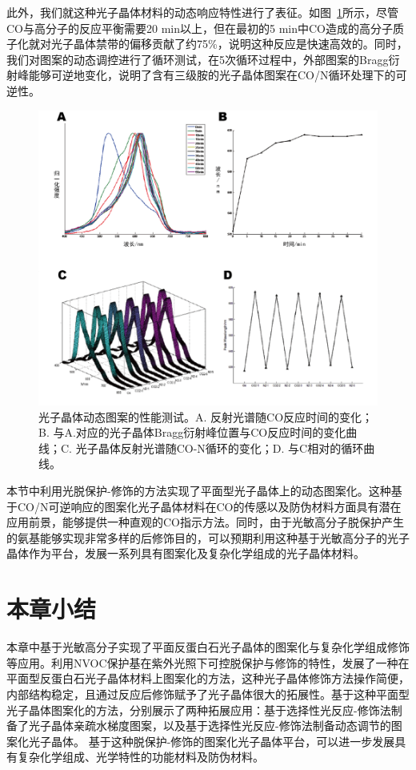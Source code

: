 此外，我们就这种光子晶体材料的动态响应特性进行了表征。如图~\ref{fig:CO2-saturation}所示，尽管CO与高分子的反应平衡需要20 min以上，但在最初的5 min中CO造成的高分子质子化就对光子晶体禁带的偏移贡献了约75\%，说明这种反应是快速高效的。同时，我们对图案的动态调控进行了循环测试，在5次循环过程中，外部图案的Bragg衍射峰能够可逆地变化，说明了含有三级胺的光子晶体图案在CO/N循环处理下的可逆性。
\begin{figure}[htbp]
  \centering
  \includegraphics[width=0.85\linewidth]{figures/ch4/CO2-saturation.png}
  \caption{光子晶体动态图案的性能测试。A. 反射光谱随CO反应时间的变化；B. 与A.对应的光子晶体Bragg衍射峰位置与CO反应时间的变化曲线；C. 光子晶体反射光谱随CO-N循环的变化；D. 与C相对的循环曲线。}
  \label{fig:CO2-saturation}
\end{figure}

本节中利用光脱保护-修饰的方法实现了平面型光子晶体上的动态图案化。这种基于CO/N可逆响应的图案化光子晶体材料在CO的传感以及防伪材料方面具有潜在应用前景，能够提供一种直观的CO指示方法。同时，由于光敏高分子脱保护产生的氨基能够实现非常多样的后修饰目的，可以预期利用这种基于光敏高分子的光子晶体作为平台，发展一系列具有图案化及复杂化学组成的光子晶体材料。


\section{本章小结}

本章中基于光敏高分子实现了平面反蛋白石光子晶体的图案化与复杂化学组成修饰等应用。利用NVOC保护基在紫外光照下可控脱保护与修饰的特性，发展了一种在平面型反蛋白石光子晶体材料上图案化的方法，这种光子晶体修饰方法操作简便，内部结构稳定，且通过反应后修饰赋予了光子晶体很大的拓展性。基于这种平面型光子晶体图案化的方法，分别展示了两种拓展应用：基于选择性光反应-修饰法制备了光子晶体亲疏水梯度图案，以及基于选择性光反应-修饰法制备动态调节的图案化光子晶体。
基于这种脱保护-修饰的图案化光子晶体平台，可以进一步发展具有复杂化学组成、光学特性的功能材料及防伪材料。